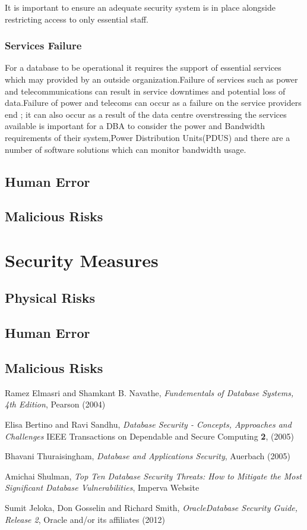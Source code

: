 \documentclass[11pt]{article}
\begin{document}
It is important to ensure an adequate security system is in place alongside restricting access to only essential staff.


\subsubsection{Services Failure}
For a database to be operational it requires the support of essential services which may provided by an outside organization.Failure of services such as power and telecommunications can result in service downtimes and potential loss of data.Failure of power and telecoms can occur as a  failure on the service providers end ; it can also occur as a result of the data centre overstressing the services available is important for a DBA to consider the power and Bandwidth requirements of their system,Power Distribution Units(PDUS)
and there are a number of software solutions which can monitor bandwidth usage.


\subsection{Human Error}
\subsection{Malicious Risks}

\section{Security Measures}
\subsection{Physical Risks}
\subsection{Human Error}
\subsection{Malicious Risks}

\begin{thebibliography}{}

  Ramez Elmasri and Shamkant B. Navathe, {\it Fundementals of Database Systems, 4th Edition}, Pearson (2004)

  Elisa Bertino and Ravi Sandhu, {\it Database Security - Concepts, Approaches and Challenges} IEEE Transactions on Dependable and Secure Computing {\bf 2},  (2005)

  Bhavani Thuraisingham, {\it Database and Applications Security}, Auerbach (2005)

  Amichai Shulman, {\it Top Ten Database Security Threats: How to Mitigate the Most Significant Database Vulnerabilities}, Imperva Website

  Sumit Jeloka, Don Gosselin and Richard Smith, {\it Oracle\textregistered Database Security Guide, Release 2}, Oracle and/or its affiliates (2012)

\end{thebibliography}
\end{document}
